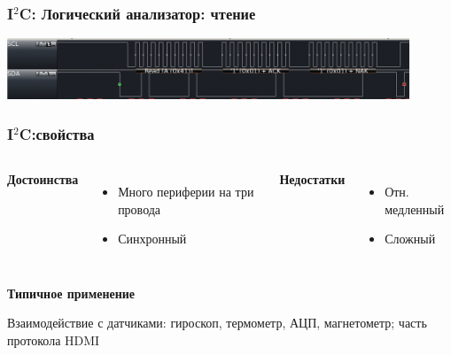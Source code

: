 \begin{frame}
  \frametitle{I$^2$C: Логический анализатор: чтение}
  \includegraphics[width=12cm]{./slides/hardware_protocols/i2c_read.png}
\end{frame}

\begin{frame}
  \frametitle{I$^2$C:свойства}
  \begin{columns}
    \column{4cm}
    \begin{center}
      {\bf\large Достоинства}
    \end{center}
    \begin{itemize}
       \item Много периферии на три провода
       \item Синхронный
    \end{itemize}
    \column{4cm}
    \begin{center}
      {\bf\large Недостатки}
    \end{center}
    \begin{itemize}
       \item Отн. медленный
       \item Сложный
    \end{itemize}
  \end{columns}
  \begin{center}
    {\bf\large Типичное применение}
  \end{center}
  Взаимодействие с датчиками: гироскоп, термометр, АЦП, магнетометр; часть протокола HDMI
\end{frame}

